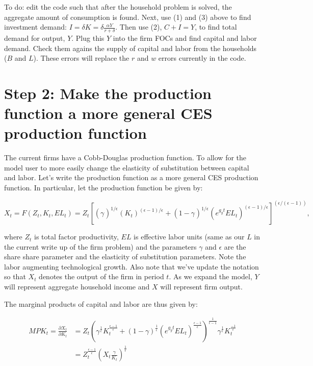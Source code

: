 \documentclass[letterpaper,12pt]{article}
\theoremstyle{definition}
\begin{document}
To do: edit the code such that after the household problem is solved, the aggregate amount of consumption is found.  Next, use (1) and (3) above to find investment demand: $I=\delta K = \delta \frac{\alpha Y}{r+\delta}$.  Then use (2),  $C+ I = Y$,  to find total demand for output, $Y$.  Plug this $Y$ into the firm FOCs and find capital and labor demand.  Check them agains the supply of capital and labor from the households ($B$ and $L$).  These errors will replace the $r$ and $w$ errors currently in the code.


\section*{Step 2: Make the production function a more general CES production function}

The current firms have a Cobb-Douglas production function. To allow for the model user to more easily change the elasticity of substitution between capital and labor. Let's write the production function as a more general CES production function.  In particular, let the production function be given by:

\begin{equation}
X_{t}  = F(Z_{t},K_{t},EL_{t})= Z_{t} \left[(\gamma_{})^{1/\epsilon_{}}(K_{t})^{(\epsilon-1)/\epsilon_{}}+(1-\gamma_{})^{1/\epsilon_{}}(e^{g_{y}t}EL_{t})^{(\epsilon_{}-1)/\epsilon_{}}\right]^{(\epsilon_{}/(\epsilon_{}-1))},
\end{equation}

\noindent\noindent where $Z_{t}$ is total factor productivity, $EL$ is effective labor units (same as our $L$ in the current write up of the firm problem) and the parameters $\gamma$ and $\epsilon$ are the share share parameter and the elasticity of substitution parameters.  Note the labor augmenting technological growth. Also note that we've update the notation so that $X_{t}$ denotes the output of the firm in period $t$.  As we expand the model, $Y$ will represent aggregate household income and $X$ will represent firm output.

The marginal products of capital and labor are thus given by:

\begin{equation}
\label{eqn:mpk}
\begin{split}
MPK_{t}=\frac{\partial X_{t}}{\partial K_{t}}&= Z_{t}\left(\gamma^{\frac{1}{\epsilon}}K_{t}^{\frac{\epsilon-1}{\epsilon}} + (1-\gamma)^{\frac{1}{\epsilon}}(e^{g_{y}t}EL_{t})^{\frac{\epsilon-1}{\epsilon}}\right)^{\frac{1}{\epsilon-1}}\gamma^{\frac{1}{\epsilon}}K_{t}^{\frac{-1}{\epsilon}}\\
& = Z_{t}^{\frac{\epsilon-1}{\epsilon}}\left(X_{t}\frac{\gamma}{K_{t}}\right)^{\frac{1}{\epsilon}}
\end{split}
\end{equation}
\end{document}
